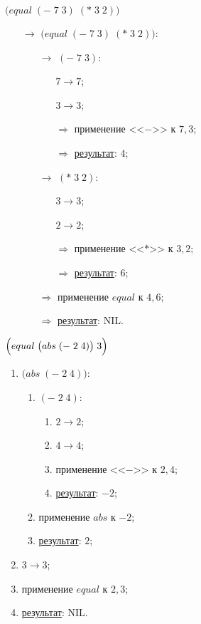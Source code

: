 \problem $\bigl(equal\; (-\; 7\; 3)\; (*\; 3\; 2) \bigr)$

\begin{itemize}
	\item[$\longrightarrow$] $\bigl(equal\; (-\; 7\; 3)\; (*\; 3\; 2) \bigr)$:
	\begin{itemize}
		\item[$\longrightarrow$] $(-\; 7\; 3)$:
		\begin{itemize}
			\item[\textbullet] $7 \to 7$;
			\item[\textbullet] $3 \to 3$;
			\item[$\Longrightarrow$] применение <<$-$>> к $7, 3$;
			\item[$\Longrightarrow$] \underline{результат}: $4$;
		\end{itemize}
		\item[$\longrightarrow$] $(*\; 3\; 2)$:
		\begin{itemize}
			\item[\textbullet] $3 \to 3$;
			\item[\textbullet] $2 \to 2$;
			\item[$\Longrightarrow$] применение <<$*$>> к $3, 2$;
			\item[$\Longrightarrow$] \underline{результат}: $6$;
		\end{itemize}
		\item[$\Longrightarrow$] применение $equal$ к $4, 6$;
		\item[$\Longrightarrow$] \underline{результат}: NIL.
	\end{itemize}
\end{itemize}


\problem $\Bigl(equal\; \bigl(abs\; (-\; 2\; 4)\bigr)\; 3\Bigr)$

\begin{enumerate}
	\item $\bigl(abs\; (-\; 2\; 4)\bigr)$:
	\begin{enumerate}
		\item $(-\; 2\; 4)$:
		\begin{enumerate}
			\item $2 \to 2$;
			\item $4 \to 4$;
			\item применение <<$-$>> к $2, 4$;
			\item \underline{результат}: $-2$;
		\end{enumerate}
		\item применение $abs$ к $-2$;
		\item \underline{результат}: $2$;
	\end{enumerate}
	\item $3 \to 3$;
	\item применение $equal$ к $2, 3$;
	\item \underline{результат}: NIL.
\end{enumerate}
\vfill



